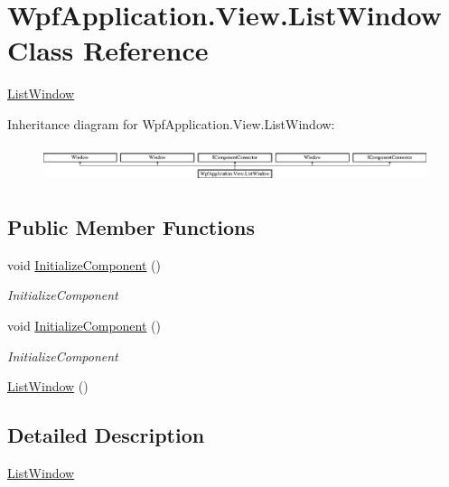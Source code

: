 \hypertarget{class_wpf_application_1_1_view_1_1_list_window}{\section{Wpf\-Application.\-View.\-List\-Window Class Reference}
\label{class_wpf_application_1_1_view_1_1_list_window}
}


\hyperlink{class_wpf_application_1_1_view_1_1_list_window}{List\-Window}  


Inheritance diagram for Wpf\-Application.\-View.\-List\-Window\-:\begin{figure}[H]
\begin{center}
\leavevmode
\includegraphics[height=1.098039cm]{class_wpf_application_1_1_view_1_1_list_window}
\end{center}
\end{figure}
\subsection*{Public Member Functions}
\begin{DoxyCompactItemize}
\item 
void \hyperlink{class_wpf_application_1_1_view_1_1_list_window_a696733c72718c7b5d8c6cb3adedc2f5c}{Initialize\-Component} ()
\begin{DoxyCompactList}\small\item\em Initialize\-Component \end{DoxyCompactList}\item 
void \hyperlink{class_wpf_application_1_1_view_1_1_list_window_a696733c72718c7b5d8c6cb3adedc2f5c}{Initialize\-Component} ()
\begin{DoxyCompactList}\small\item\em Initialize\-Component \end{DoxyCompactList}\item 
\hyperlink{class_wpf_application_1_1_view_1_1_list_window_af0e41aee8a50c9b68264bd0ac74ecd21}{List\-Window} ()
\end{DoxyCompactItemize}


\subsection{Detailed Description}
\hyperlink{class_wpf_application_1_1_view_1_1_list_window}{List\-Window} 

